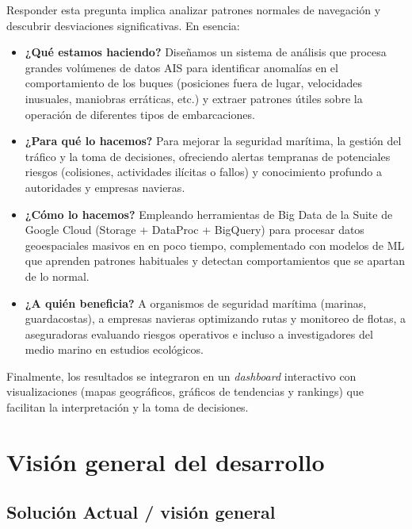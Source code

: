 \documentclass[10pt]{article}
\begin{document}
Responder esta pregunta implica analizar patrones normales de navegación y descubrir desviaciones significativas. En esencia:
\begin{itemize}
    \item \textbf{¿Qué estamos haciendo?} Diseñamos un sistema de análisis que procesa grandes volúmenes de datos AIS para identificar anomalías en el comportamiento de los buques (posiciones fuera de lugar, velocidades inusuales, maniobras erráticas, etc.) y extraer patrones útiles sobre la operación de diferentes tipos de embarcaciones.
    \item \textbf{¿Para qué lo hacemos?} Para mejorar la seguridad marítima, la gestión del tráfico y la toma de decisiones, ofreciendo alertas tempranas de potenciales riesgos (colisiones, actividades ilícitas o fallos) y conocimiento profundo a autoridades y empresas navieras.
    \item \textbf{¿Cómo lo hacemos?} Empleando herramientas de Big Data de la Suite de Google Cloud (Storage + DataProc + BigQuery) para procesar datos geoespaciales masivos en en poco tiempo, complementado con modelos de ML que aprenden patrones habituales y detectan comportamientos que se apartan de lo normal.
    \item \textbf{¿A quién beneficia?} A organismos de seguridad marítima (marinas, guardacostas), a empresas navieras optimizando rutas y monitoreo de flotas, a aseguradoras evaluando riesgos operativos e incluso a investigadores del medio marino en estudios ecológicos.
\end{itemize}

Finalmente, los resultados se integraron en un \textit{dashboard} interactivo con visualizaciones (mapas geográficos, gráficos de tendencias y rankings) que facilitan la interpretación y la toma de decisiones.
\section{Visión general del desarrollo} 
\subsection{Solución Actual / visión general} %
\end{document}
